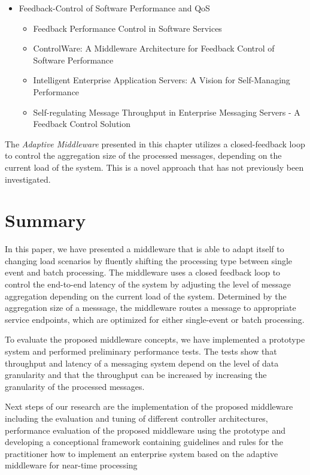 \begin{itemize}
	\item Feedback-Control of Software Performance and \ac{QoS}
	\begin{itemize}
		\item Feedback Performance Control in Software Services \citep{Abdelzaher:2003ea}
		\item ControlWare: A Middleware Architecture for Feedback Control of Software Performance \citep{Zhang:2002gf}
		\item Intelligent Enterprise Application Servers: A Vision for Self-Managing Performance \citep{Kumar:2013bw}
		\item Self-regulating Message Throughput in Enterprise Messaging Servers - A Feedback Control Solution \citep{Kumar:2012we}
	\end{itemize}
\end{itemize}

The \emph{Adaptive Middleware} presented in this chapter utilizes a closed-feedback loop to control the aggregation size of the processed messages, depending on the current load of the system. This is a novel approach that has not previously been investigated.

\section{Summary}\label{sec:ch5_summary}
In this paper, we have presented a middleware that is able to adapt itself to changing load scenarios by fluently shifting the processing type between single event and batch processing. The middleware uses a closed feedback loop to control the end-to-end latency of the system by adjusting the level of message aggregation depending on the current load of the system. Determined by the aggregation size of a messsage, the middleware routes a message to appropriate service endpoints, which are optimized for either single-event or batch processing.

To evaluate the proposed middleware concepts, we have implemented a prototype system and performed preliminary performance tests. The tests show that throughput and latency of a messaging system depend on the level of data granularity and that the throughput can be increased by increasing the granularity of the processed messages.

Next steps of our research are the implementation of the proposed middleware including the evaluation and tuning of different controller architectures, performance evaluation of the proposed middleware using the prototype and developing a conceptional framework containing guidelines and rules for the practitioner how to implement an enterprise system based on the adaptive middleware for near-time processing
